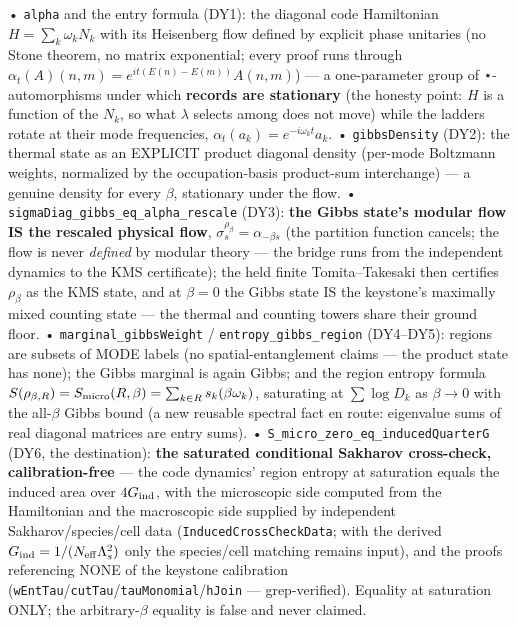\documentclass[11pt,a4paper]{article}
\begin{document}
  • \texttt{alpha} and the entry formula (DY1): the diagonal code Hamiltonian $H = \sum_k \omega_k N_k$ with its Heisenberg flow defined by explicit phase unitaries (no Stone theorem, no matrix exponential; every proof runs through $\alpha_t(A)(n,m) = e^{it(E(n)-E(m))}A(n,m)$) — a one-parameter group of ⋆-automorphisms under which \textbf{records are stationary} (the honesty point: $H$ is a function of the $N_k$, so what $\lambda$ selects among does not move) while the ladders rotate at their mode frequencies, $\alpha_t(a_k) = e^{-i\omega_k t}a_k$.
  • \texttt{gibbsDensity} (DY2): the thermal state as an EXPLICIT product diagonal density (per-mode Boltzmann weights, normalized by the occupation-basis product-sum interchange) — a genuine density for every $\beta$, stationary under the flow.
  • \texttt{sigmaDiag\_gibbs\_eq\_alpha\_rescale} (DY3): \textbf{the Gibbs state's modular flow IS the rescaled physical flow}, $\sigma_s^{\rho_\beta} = \alpha_{-\beta s}$ (the partition function cancels; the flow is never \emph{defined} by modular theory — the bridge runs from the independent dynamics to the KMS certificate); the held finite Tomita--Takesaki then certifies $\rho_\beta$ as the KMS state, and at $\beta = 0$ the Gibbs state IS the keystone's maximally mixed counting state — the thermal and counting towers share their ground floor.
  • \texttt{marginal\_gibbsWeight} / \texttt{entropy\_gibbs\_region} (DY4--DY5): regions are subsets of MODE labels (no spatial-entanglement claims — the product state has none); the Gibbs marginal is again Gibbs; and the region entropy formula $S(\rho_{\beta,R}) = S_{\rm micro}(R,\beta) = \sum_{k\in R} s_k(\beta\omega_k)$, saturating at $\sum \log D_k$ as $\beta \to 0$ with the all-$\beta$ Gibbs bound (a new reusable spectral fact en route: eigenvalue sums of real diagonal matrices are entry sums).
  • \texttt{S\_micro\_zero\_eq\_inducedQuarterG} (DY6, the destination): \textbf{the saturated conditional Sakharov cross-check, calibration-free} — the code dynamics' region entropy at saturation equals the induced area over $4G_{\rm ind}$, with the microscopic side computed from the Hamiltonian and the macroscopic side supplied by independent Sakharov/species/cell data (\texttt{InducedCrossCheckData}; with the derived $G_{\rm ind} = 1/(N_{\rm eff}\Lambda_s^2)$ only the species/cell matching remains input), and the proofs referencing NONE of the keystone calibration (\texttt{wEntTau}/\texttt{cutTau}/\texttt{tauMonomial}/\texttt{hJoin} — grep-verified). Equality at saturation ONLY; the arbitrary-$\beta$ equality is false and never claimed.
\end{document}
